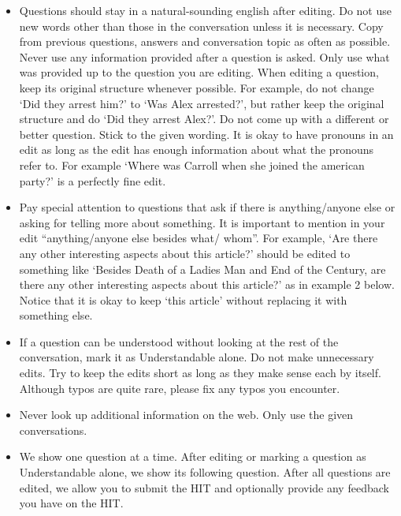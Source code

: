 \begin{tcolorbox}[width=\textwidth,colback={white},title={Rewrite each question in a dialogue so it can be understood by itself without looking at the rest of the dialogue.},colbacktitle=white,coltitle=black]
\begin{itemize}
\item Questions should stay in a natural-sounding english after editing. Do not use new words other
 than those in the conversation unless it is necessary. Copy from previous questions, answers and
  conversation topic as often as possible. Never use any information provided after a question is
   asked. Only use what was provided up to the question you are editing. When editing a question,
    keep its original structure whenever possible. For example, do not change `Did they arrest him?' to
     `Was Alex arrested?', but rather keep the original structure and do `Did they arrest Alex?'. Do not
      come up with a different or better question. Stick to the given wording. It is okay to have pronouns
       in an edit as long as the edit has enough information about what the pronouns refer to. For
        example `Where was Carroll when she joined the american party?' is a perfectly fine edit.
        \item Pay special attention to questions that ask if there is anything/anyone else or asking for telling
 more about something. It is important to mention in your edit ``anything/anyone else besides what/
 whom''. For example, `Are there any other interesting aspects about this article?' should be edited to
  something like `Besides Death of a Ladies Man and End of the Century, are there any other
   interesting aspects about this article?' as in example 2 below. Notice that it is okay to keep `this
    article' without replacing it with something else.
    \item If a question can be understood without looking at the rest of the conversation, mark it as
 Understandable alone. Do not make unnecessary edits. Try to keep the edits short as long as they
  make sense each by itself. Although typos are quite rare, please fix any typos you encounter.
  \item Never look up additional information on the web. Only use the given conversations.
\item We show one question at a time. After editing or marking a question as Understandable alone,
 we show its following question. After all questions are edited, we allow you to submit the HIT and
  optionally provide any feedback you have on the HIT.

\end{itemize}
\end{tcolorbox}    

\newpage
